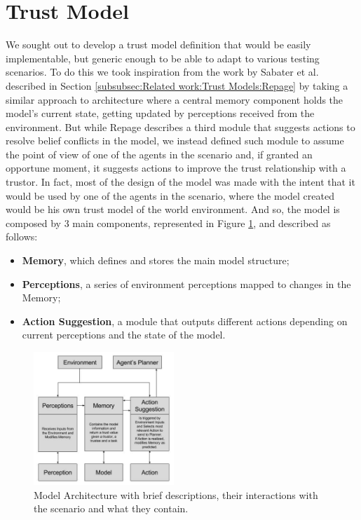 
\section{Trust Model}
\label{sec:TrustModel}
We sought out to develop a trust model definition that would be easily implementable, but generic enough to be able to adapt to various testing scenarios. To do this we took inspiration from the work by Sabater et al. \cite{Sabater2006} described in Section \ref{subsubsec:Related work:Trust Models:Repage} by taking a similar approach to architecture where a central memory component holds the model's current state, getting updated by perceptions received from the environment. But while Repage describes a third module that suggests actions to resolve belief conflicts in the model, we instead defined such module to assume the point of view of one of the agents in the scenario and, if granted an opportune moment, it suggests actions to improve the trust relationship with a trustor. In fact, most of the design of the model was made with the intent that it would be used by one of the agents in the scenario, where the model created would be his own trust model of the world environment.  And so, the model is composed by 3 main components, represented in Figure \ref{fig:ModelArchitecture}, and described as follows:
\begin{itemize}
    \item \textbf{Memory}, which defines and stores the main model structure;
    \item \textbf{Perceptions}, a series of environment perceptions mapped to changes in the Memory;
    \item \textbf{Action Suggestion}, a module that outputs different actions depending on current perceptions and the state of the model.
\end{itemize}

\begin{figure}[hbt]
    \centering
    \includegraphics[width=200px]{figures/ModelDiagram.jpg}
    \caption{Model Architecture with brief descriptions, their interactions with the scenario and what they contain.}
    \label{fig:ModelArchitecture}
\end{figure}



